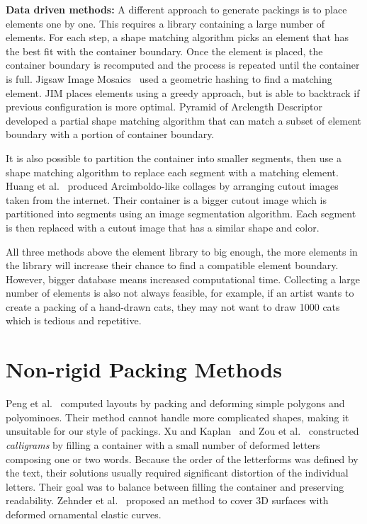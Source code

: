 \textbf{Data driven methods:}
A different approach to generate packings is to
place elements one by one. This requires a library containing
a large number of elements. For each step, a shape matching algorithm
picks an element that has the best fit with the container boundary.
Once the element is placed, the container boundary is recomputed and
the process is repeated until the container is full.
Jigsaw Image Mosaics~\cite{Kim2002} used a geometric hashing to find
a matching element. JIM places elements using a greedy approach, but is able to backtrack 
if previous configuration is more optimal.
Pyramid of Arclength Descriptor~\cite{Kwan2016} developed
a partial shape matching algorithm that can match a subset of element boundary with a portion
of container boundary.

It is also possible to partition the container into smaller segments,
then use a shape matching algorithm to replace each segment with
a matching element.
Huang et al.~\cite{Huang2011} produced Arcimboldo-like collages
by arranging cutout images taken from the internet.
Their container is a bigger cutout image which is partitioned into segments
using an image segmentation algorithm.
Each segment is then replaced with a cutout image that has a similar shape and color.

All three methods above the element library to big enough,
the more elements in the library will increase their chance to find a compatible element boundary.
However, bigger database means increased computational time.
Collecting a large number of elements is also not always feasible,
for example, if an artist wants to create a packing of a hand-drawn cats,
they may not want to draw 1000 cats which is tedious and repetitive.

\section{Non-rigid Packing Methods}


Peng et al.~\cite{Peng2014} computed layouts by packing and deforming
simple polygons and polyominoes. Their method cannot handle more
complicated shapes, making it unsuitable for our style of packings.
Xu and Kaplan~\cite{Xu2007} and Zou et al.~\cite{Zou2016}
constructed \textit{calligrams} by filling a container with a small
number of deformed letters composing one or two words.  Because the
order of the letterforms was defined by the text, their solutions
usually required significant distortion of the individual letters.
Their goal was to balance between filling the container and preserving
readability.
Zehnder et al.~\cite{Zehnder2016} proposed an method to
cover 3D surfaces with deformed ornamental elastic curves.



